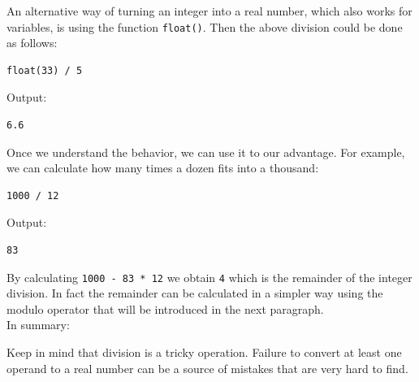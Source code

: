 \documentclass[article,A4,12pt]{llncs}
\begin{document}
\noindent
An alternative way of turning an integer into a real number, which 
also works for variables, is using the function {\tt float()}. Then
the above division could be done as follows:\\

\begin{bbox}
\begin{verbatim}
float(33) / 5
\end{verbatim}
\end{bbox}
\vspace{6mm}

\noindent
Output:\\

\begin{ybox}
\begin{verbatim}
6.6
\end{verbatim}
\end{ybox}
\vspace{6mm}

\noindent
Once we understand the behavior, we can use it to our advantage. For example,
we can calculate how many times a dozen fits into a thousand:\\

\begin{bbox}
\begin{verbatim}
1000 / 12
\end{verbatim}
\end{bbox}
\vspace{6mm}

\noindent
Output:\\

\begin{ybox}
\begin{verbatim}
83
\end{verbatim}
\end{ybox}
\vspace{6mm}

\noindent
By calculating {\tt 1000 - 83 * 12} we obtain {\tt 4} which is the remainder of the 
integer division. In fact the remainder can be calculated in a simpler way
using the modulo operator that will be introduced in the next paragraph.\\

\noindent
In summary:\\

\begin{gbox}
\begin{center}
Keep in mind that division is a tricky operation. Failure to convert at least one operand 
to a real number can be a source of mistakes that are very hard to find.
\end{center}
\end{gbox}
\end{document}
